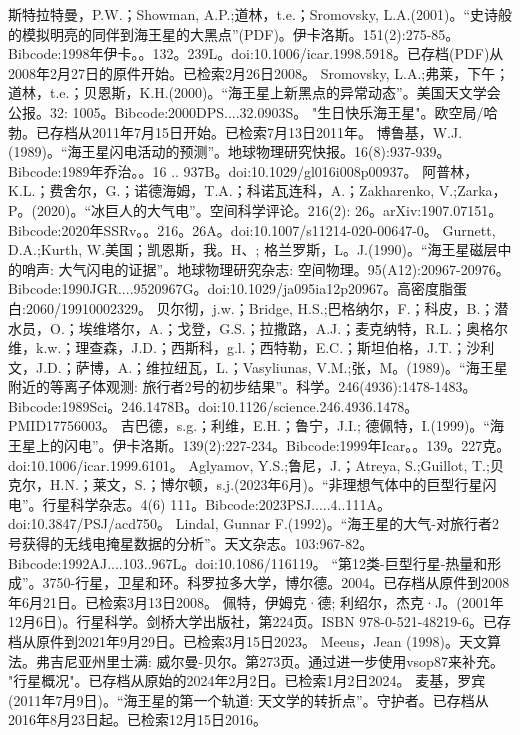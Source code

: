 \begin{enumerate}
 斯特拉特曼，P.W.；Showman, A.P.;道林，t.e.；Sromovsky, L.A.(2001)。“史诗般的模拟明亮的同伴到海王星的大黑点”(PDF)。伊卡洛斯。151(2):275-85。Bibcode:1998年伊卡。。132。239L。doi:10.1006/icar.1998.5918。已存档(PDF)从2008年2月27日的原件开始。已检索2月26日2008。
 Sromovsky, L.A.;弗莱，下午；道林，t.e.；贝恩斯，K.H.(2000)。“海王星上新黑点的异常动态”。美国天文学会公报。32: 1005。Bibcode:2000DPS....32.0903S。
 "生日快乐海王星"。欧空局/哈勃。已存档从2011年7月15日开始。已检索7月13日2011年。
 博鲁基，W.J.(1989)。“海王星闪电活动的预测”。地球物理研究快报。16(8):937-939。Bibcode:1989年乔治。。16 .. 937B。doi:10.1029/gl016i008p00937。
 阿普林，K.L.；费舍尔，G.；诺德海姆，T.A.；科诺瓦连科，A.；Zakharenko, V.;Zarka，P。(2020)。“冰巨人的大气电”。空间科学评论。216(2): 26。arXiv:1907.07151。Bibcode:2020年SSRv。。216。26A。doi:10.1007/s11214-020-00647-0。
 Gurnett, D.A.;Kurth, W.美国；凯恩斯，我。H、; 格兰罗斯，L。J.(1990)。“海王星磁层中的哨声: 大气闪电的证据”。地球物理研究杂志: 空间物理。95(A12):20967-20976。Bibcode:1990JGR....9520967G。doi:10.1029/ja095ia12p20967。高密度脂蛋白:2060/19910002329。
 贝尔彻，j.w.；Bridge, H.S.;巴格纳尔，F.；科皮，B.；潜水员，O.；埃维塔尔，A.；戈登，G.S.；拉撒路，A.J.；麦克纳特，R.L.；奥格尔维，k.w.；理查森，J.D.；西斯科，g.l.；西特勒，E.C.；斯坦伯格，J.T.；沙利文，J.D.；萨博，A.；维拉纽瓦，L.；Vasyliunas, V.M.;张，M。(1989)。“海王星附近的等离子体观测: 旅行者2号的初步结果”。科学。246(4936):1478-1483。Bibcode:1989Sci。246.1478B。doi:10.1126/science.246.4936.1478。PMID17756003。 
 吉巴德，s.g.；利维，E.H.；鲁宁，J.I.; 德佩特，I.(1999)。“海王星上的闪电”。伊卡洛斯。139(2):227-234。Bibcode:1999年Icar。。139。227克。doi:10.1006/icar.1999.6101。
 Aglyamov, Y.S.;鲁尼，J.；Atreya, S.;Guillot, T.;贝克尔，H.N.；莱文，S.；博尔顿，s.j.(2023年6月)。“非理想气体中的巨型行星闪电”。行星科学杂志。4(6) 111。Bibcode:2023PSJ.....4..111A。doi:10.3847/PSJ/acd750。
 Lindal, Gunnar F.(1992)。“海王星的大气-对旅行者2号获得的无线电掩星数据的分析”。天文杂志。103:967-82。Bibcode:1992AJ....103..967L。doi:10.1086/116119。
 “第12类-巨型行星-热量和形成”。3750-行星，卫星和环。科罗拉多大学，博尔德。2004。已存档从原件到2008年6月21日。已检索3月13日2008。
 佩特，伊姆克·德; 利绍尔，杰克·J。(2001年12月6日)。行星科学。剑桥大学出版社，第224页。ISBN 978-0-521-48219-6。已存档从原件到2021年9月29日。已检索3月15日2023。
 Meeus，Jean (1998)。天文算法。弗吉尼亚州里士满: 威尔曼-贝尔。第273页。通过进一步使用vsop87来补充。
 "行星概况"。已存档从原始的2024年2月2日。已检索1月2日2024。
 麦基，罗宾 (2011年7月9日)。“海王星的第一个轨道: 天文学的转折点”。守护者。已存档从2016年8月23日起。已检索12月15日2016。

\end{enumerate}
